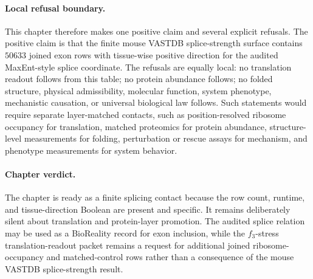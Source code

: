 \paragraph{Local refusal boundary.}
This chapter therefore makes one positive claim and several explicit refusals.  The positive claim is that the finite mouse VASTDB splice-strength surface contains $50633$ joined exon rows with tissue-wise positive direction for the audited MaxEnt-style splice coordinate.  The refusals are equally local: no translation readout follows from this table; no protein abundance follows; no folded structure, physical admissibility, molecular function, system phenotype, mechanistic causation, or universal biological law follows.  Such statements would require separate layer-matched contacts, such as position-resolved ribosome occupancy for translation, matched proteomics for protein abundance, structure-level measurements for folding, perturbation or rescue assays for mechanism, and phenotype measurements for system behavior.

\paragraph{Chapter verdict.}
The chapter is ready as a finite splicing contact because the row count, runtime, and tissue-direction Boolean are present and specific.  It remains deliberately silent about translation and protein-layer promotion.  The audited splice relation may be used as a BioReality record for exon inclusion, while the $f_3$-stress translation-readout packet remains a request for additional joined ribosome-occupancy and matched-control rows rather than a consequence of the mouse VASTDB splice-strength result.